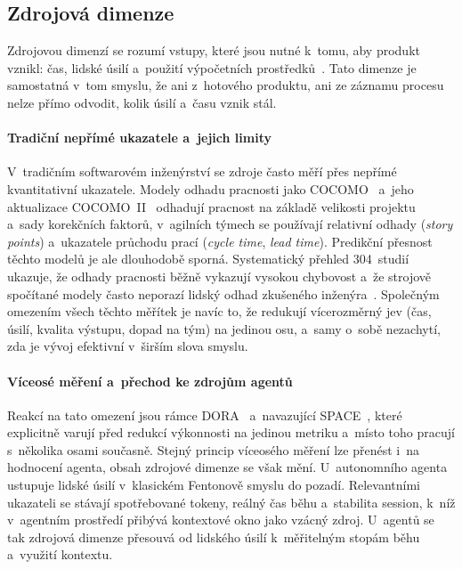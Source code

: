 \subsection{Zdrojová dimenze}
\label{sec:zdrojova-dimenze}
\label{sec:modely-metodiky}

Zdrojovou dimenzí se rozumí vstupy, které jsou nutné k~tomu, aby
produkt vznikl: čas, lidské úsilí a~použití výpočetních
prostředků~\cite{fenton2014}. Tato dimenze je samostatná v~tom
smyslu, že ani z~hotového produktu, ani ze záznamu procesu nelze
přímo odvodit, kolik úsilí a~času vznik stál.

\paragraph{Tradiční nepřímé ukazatele a~jejich limity}
V~tradičním softwarovém inženýrství se zdroje často měří přes nepřímé
kvantitativní ukazatele. Modely odhadu pracnosti jako
COCOMO~\cite{boehm1981cocomo} a~jeho aktualizace
COCOMO~II~\cite{boehm2000cocomoii} odhadují pracnost na základě
velikosti projektu a~sady korekčních faktorů, v~agilních týmech se
používají relativní odhady (\textit{story points}) a~ukazatele
průchodu prací (\textit{cycle time}, \textit{lead time}). Predikční
přesnost těchto modelů je ale dlouhodobě sporná. Systematický přehled
304~studií ukazuje, že odhady pracnosti běžně vykazují vysokou chybovost
a~že strojově spočítané modely často neporazí lidský odhad zkušeného
inženýra~\cite{jorgensen2007review}.
Společným omezením všech těchto měřítek je navíc to, že redukují
vícerozměrný jev (čas, úsilí, kvalita výstupu, dopad na tým) na
jedinou osu, a~samy o~sobě nezachytí, zda je vývoj efektivní v~širším
slova smyslu.

\paragraph{Víceosé měření a~přechod ke zdrojům agentů}
Reakcí na tato omezení jsou rámce DORA~\cite{forsgren2018}
a~navazující SPACE~\cite{forsgren2021space}, které explicitně varují
před redukcí výkonnosti na jedinou metriku a~místo toho pracují
s~několika osami současně. Stejný princip víceosého měření lze přenést
i~na hodnocení agenta, obsah zdrojové dimenze se však mění. U~autonomního
agenta ustupuje lidské úsilí v~klasickém Fentonově smyslu do pozadí.
Relevantními ukazateli se stávají spotřebované tokeny, reálný čas běhu
a~stabilita session, k~níž v~agentním prostředí přibývá kontextové okno
jako vzácný zdroj. U~agentů se tak zdrojová dimenze přesouvá od
lidského úsilí k~měřitelným stopám běhu a~využití kontextu.

